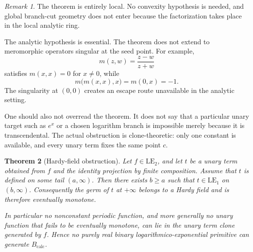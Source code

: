 \documentclass[11pt]{amsart}
\numberwithin{equation}{section}
\newtheorem{theorem}{Theorem}[section]
\theoremstyle{remark}
\newtheorem{remark}[theorem]{Remark}
\theoremstyle{definition}
\newcommand{\LE}{\mathrm{LE}}
\newcommand{\calc}{B_{\mathrm{calc}}}
\begin{document}
\begin{remark}
The theorem is entirely local. No convexity hypothesis is needed, and global branch-cut geometry does not enter because the factorization takes place in the local analytic ring.

The analytic hypothesis is essential. The theorem does not extend to meromorphic operators singular at the seed point. For example,
\[
m(z,w)=\frac{z-w}{z+w}
\]
satisfies $m(x,x)=0$ for $x\neq 0$, while
\[
m\bigl(m(x,x),x\bigr)=m(0,x)=-1.
\]
The singularity at $(0,0)$ creates an escape route unavailable in the analytic setting.

One should also not overread the theorem. It does not say that a particular unary target such as $e^x$ or a chosen logarithm branch is impossible merely because it is transcendental. The actual obstruction is clone-theoretic: only one constant is available, and every unary term fixes the same point $c$.
\end{remark}

\begin{theorem}[Hardy-field obstruction]\label{thm:hardy}
Let $f\in \LE_2$, and let $t$ be a unary term obtained from $f$ and the identity projection by finite composition. Assume that $t$ is defined on some tail $(a,\infty)$. Then there exists $b\geq a$ such that $t\in \LE_1$ on $(b,\infty)$. Consequently the germ of $t$ at $+\infty$ belongs to a Hardy field and is therefore eventually monotone.

In particular no nonconstant periodic function, and more generally no unary function that fails to be eventually monotone, can lie in the unary term clone generated by $f$. Hence no purely real binary logarithmico-exponential primitive can generate $\calc$.
\end{theorem}
\end{document}
